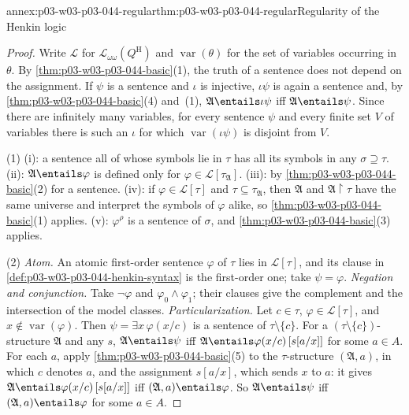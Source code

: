 \begin{annexitem}{annex:p03-w03-p03-044-regular}{thm:p03-w03-p03-044-regular}{Regularity of the Henkin logic}
\begin{proof}
Write \(\mathscr L\) for \(\mathscr L_{\omega\omega}(Q^{\mathrm H})\) and
\(\operatorname{var}(\theta)\) for the set of variables occurring in
\(\theta\).  By \cref{thm:p03-w03-p03-044-basic}(1), the truth of a sentence
does not depend on the assignment.  If \(\psi\) is a sentence and \(\iota\)
is injective, \(\iota\psi\) is again a sentence and, by
\cref{thm:p03-w03-p03-044-basic}(4) and~(1),
\(\mathfrak A\entails\iota\psi\) iff \(\mathfrak A\entails\psi\).  Since
there are infinitely many variables, for every sentence \(\psi\) and every
finite set \(V\) of variables there is such an \(\iota\) for which
\(\operatorname{var}(\iota\psi)\) is disjoint from \(V\).

(1) (i): a sentence all of whose symbols lie in \(\tau\) has all its
symbols in any \(\sigma\supseteq\tau\).  (ii): \(\mathfrak A\entails
\varphi\) is defined only for \(\varphi\in\mathscr L[\tau_{\mathfrak A}]\).
(iii): by \cref{thm:p03-w03-p03-044-basic}(2) for a sentence.  (iv): if
\(\varphi\in\mathscr L[\tau]\) and \(\tau\subseteq\tau_{\mathfrak A}\), then
\(\mathfrak A\) and \(\mathfrak A\restriction\tau\) have the same universe
and interpret the symbols of \(\varphi\) alike, so
\cref{thm:p03-w03-p03-044-basic}(1) applies.  (v): \(\varphi^\rho\) is a
sentence of \(\sigma\), and \cref{thm:p03-w03-p03-044-basic}(3) applies.

(2) \emph{Atom.}  An atomic first-order sentence \(\varphi\) of \(\tau\) lies
in \(\mathscr L[\tau]\), and its clause in
\cref{def:p03-w03-p03-044-henkin-syntax} is the first-order one; take
\(\psi=\varphi\).  \emph{Negation and conjunction.}  Take \(\neg\varphi\) and
\(\varphi_0\land\varphi_1\); their clauses give the complement and the
intersection of the model classes.  \emph{Particularization.}  Let
\(c\in\tau\), \(\varphi\in\mathscr L[\tau]\), and \(x\notin
\operatorname{var}(\varphi)\).  Then \(\psi=\exists x\,\varphi(x/c)\) is a
sentence of \(\tau\setminus\{c\}\).  For a \((\tau\setminus\{c\})\)-structure
\(\mathfrak A\) and any \(s\), \(\mathfrak A\entails\psi\) iff
\(\mathfrak A\entails\varphi(x/c)\,[s[a/x]]\) for some \(a\in A\).  For each
\(a\), apply \cref{thm:p03-w03-p03-044-basic}(5) to the \(\tau\)-structure
\((\mathfrak A,a)\), in which \(c\) denotes \(a\), and the assignment
\(s[a/x]\), which sends \(x\) to \(a\): it gives
\(\mathfrak A\entails\varphi(x/c)\,[s[a/x]]\) iff
\((\mathfrak A,a)\entails\varphi\).  So \(\mathfrak A\entails\psi\) iff
\((\mathfrak A,a)\entails\varphi\) for some \(a\in A\).


\end{proof}
\end{annexitem}
